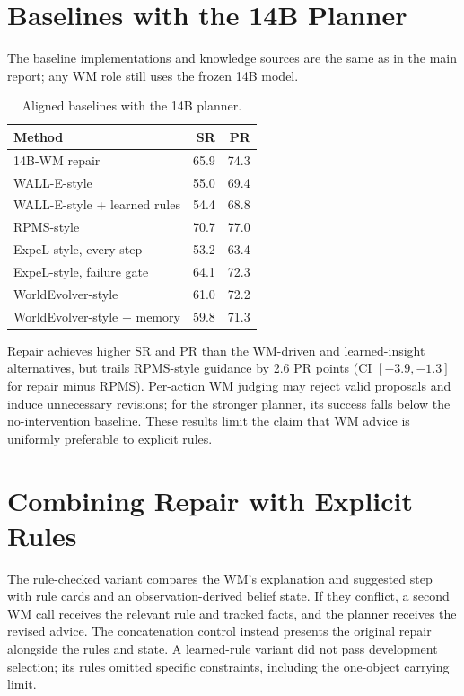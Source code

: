 \section{Baselines with the 14B Planner}
The baseline implementations and knowledge sources are the same as in the main report; any WM role still uses the frozen 14B model.
\begin{table}[h]
\caption{Aligned baselines with the 14B planner.}
\centering\begin{tabular}{lrr}\toprule
Method & SR & PR\\\midrule
14B-WM repair & 65.9 & 74.3\\
WALL-E-style & 55.0 & 69.4\\
WALL-E-style + learned rules & 54.4 & 68.8\\
RPMS-style & 70.7 & 77.0\\
ExpeL-style, every step & 53.2 & 63.4\\
ExpeL-style, failure gate & 64.1 & 72.3\\
WorldEvolver-style & 61.0 & 72.2\\
WorldEvolver-style + memory & 59.8 & 71.3\\\bottomrule
\end{tabular}
\end{table}
Repair achieves higher SR and PR than the WM-driven and learned-insight alternatives, but trails RPMS-style guidance by 2.6 PR points (CI $[-3.9,-1.3]$ for repair minus RPMS). Per-action WM judging may reject valid proposals and induce unnecessary revisions; for the stronger planner, its success falls below the no-intervention baseline. These results limit the claim that WM advice is uniformly preferable to explicit rules.

\section{Combining Repair with Explicit Rules}
The rule-checked variant compares the WM's explanation and suggested step with rule cards and an observation-derived belief state. If they conflict, a second WM call receives the relevant rule and tracked facts, and the planner receives the revised advice. The concatenation control instead presents the original repair alongside the rules and state. A learned-rule variant did not pass development selection; its rules omitted specific constraints, including the one-object carrying limit.


